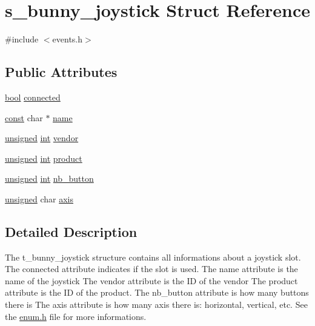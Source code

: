 \hypertarget{structs__bunny__joystick}{\section{s\-\_\-bunny\-\_\-joystick Struct Reference}
\label{structs__bunny__joystick}
}


{\ttfamily \#include $<$events.\-h$>$}

\subsection*{Public Attributes}
\begin{DoxyCompactItemize}
\item 
\hyperlink{term__entry_8h_a002004ba5d663f149f6c38064926abac}{bool} \hyperlink{structs__bunny__joystick_af8a00efee0de4a774de005bcba5c57f1}{connected}
\item 
\hyperlink{term__entry_8h_a57bd63ce7f9a353488880e3de6692d5a}{const} char $\ast$ \hyperlink{structs__bunny__joystick_aef701af9b1eac34dcadb2c3a03212fba}{name}
\item 
\hyperlink{curses_8priv_8h_aca40206900cfc164654362fa8d4ad1e6}{unsigned} \hyperlink{term__entry_8h_ad65b480f8c8270356b45a9890f6499ae}{int} \hyperlink{structs__bunny__joystick_a74d111731235abb1b62cf8b83d84c350}{vendor}
\item 
\hyperlink{curses_8priv_8h_aca40206900cfc164654362fa8d4ad1e6}{unsigned} \hyperlink{term__entry_8h_ad65b480f8c8270356b45a9890f6499ae}{int} \hyperlink{structs__bunny__joystick_adc746fe783c3346f40287c899b88d033}{product}
\item 
\hyperlink{curses_8priv_8h_aca40206900cfc164654362fa8d4ad1e6}{unsigned} \hyperlink{term__entry_8h_ad65b480f8c8270356b45a9890f6499ae}{int} \hyperlink{structs__bunny__joystick_a589742fe4069ab75deac27b0e9b9ce62}{nb\-\_\-button}
\item 
\hyperlink{curses_8priv_8h_aca40206900cfc164654362fa8d4ad1e6}{unsigned} char \hyperlink{structs__bunny__joystick_a2032cd0f083d487475862ff7cf84b7ae}{axis}
\end{DoxyCompactItemize}


\subsection{Detailed Description}
The t\-\_\-bunny\-\_\-joystick structure contains all informations about a joystick slot. The connected attribute indicates if the slot is used. The name attribute is the name of the joystick The vendor attribute is the I\-D of the vendor The product attribute is the I\-D of the product. The nb\-\_\-button attribute is how many buttons there is The axis attribute is how many axis there is\-: horizontal, vertical, etc. See the \hyperlink{enum_8h}{enum.\-h} file for more informations. 

